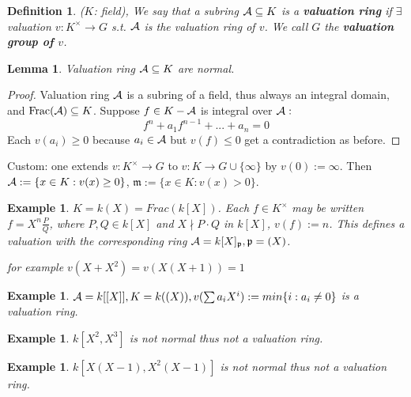 \documentclass[11pt]{article}
\newtheorem{lemma}[thm]{Lemma}
\newtheorem{dfn}[thm]{Definition}
\newtheorem{ex}[thm]{Example}
\newcommand{\scm}{{\mathfrak m}}
\newcommand{\scp}{{\mathfrak p}}
\newcommand{\cala}{{\cal A}}
\newcommand{\lrta}{\longrightarrow}
\begin{document}
\begin{dfn}
($K$: field), We say that a subring $\cala\subseteq K$ is a \textbf{valuation ring} if $\exists $ valuation $v:K^\times\lrta G$ s.t. $\cala$ is the valuation ring of $v$. We call $G$ the \textbf{valuation group of $v$}.
\end{dfn}

\begin{lemma}\label{lem:VR_normal}
Valuation ring $\cala\subseteq K$  are normal. 
\end{lemma}
\begin{proof}
Valuation ring $\cala$ is a subring of a field, thus always an integral domain, and $\text{Frac}(\cala)\subseteq K$.
Suppose $f\in K-\cala$ is integral over $\cala:$
$$
f^n+a_1 f^{n-1}+...+a_n=0
$$
Each $v(a_i)\geq 0$ because $a_i\in \cala$ but $v(f)\leq 0$ get a contradiction as before.
\end{proof}

Custom: one extends $v: K^\times\lrta G$ to $v: K\lrta G\cup \{\infty\}$ by $v(0):=\infty$.
Then $\cala:=\{x\in K:v(x)\geq 0\}$, $\scm:=\{x\in K:v(x)>0\}$.\\

\begin{ex}
$K=k(X)=Frac(k[X])$. Each $f\in K^\times$ may be written $f=X^n\frac{P}{Q}$, where $P,Q\in k[X]$ and $X\nmid P\cdot Q$ in $k[X]$, $v(f):=n$. This defines a valuation with the corresponding ring 
$\cala=k[X]_\scp,\scp=(X)$. 

for example
$v(X+X^2)=v(X(X+1))=1$
\end{ex}
\begin{ex}
$\cala=k[[X]], K=k((X)), v(\sum a_i X^i):=min\{i:a_i\neq 0\}$ is  a valuation ring.
\end{ex}
\begin{ex}
$k[X^2,X^3]$ is not normal thus not a valuation ring.
\end{ex}
\begin{ex}
$k[X(X-1),X^2(X-1)]$ is not normal thus not a valuation ring.
\end{ex}
\end{document}

